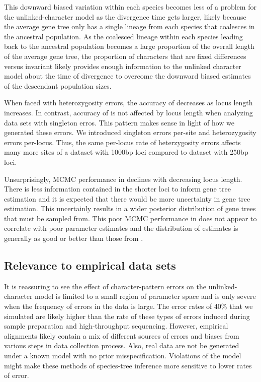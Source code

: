 This downward biased variation within each species becomes
less of a problem for the unlinked-character model as the
divergence time gets larger, likely because the average gene
tree only has a single lineage from each species that coalesces
in the ancestral population.
As the coalesced lineage within each species leading back
to the ancestral population becomes a large proportion
of the overall length of the average gene tree,
the proportion of characters that are fixed differences versus invariant
likely provides enough information to
the unlinked character model about the time of divergence to overcome
the downward biased estimates of the descendant population sizes.

When faced with heterozygosity errors,
the accuracy of \ecoevolity decreases as locus length increases.
In contrast, accuracy of \ecoevolity is not affected by locus
length when analyzing data sets with singleton erros.
This pattern makes sense in light of how we generated these errors.
We introduced singleton errors per-site and heterozygosity errors per-locus.
Thus, the same per-locus rate of heterzygosity errors affects many more sites
of a dataset with 1000bp loci compared to dataset with 250bp loci.

Unsurprisingly, MCMC performance in \beast declines with decreasing locus length.
There is less information contained in the shorter loci to inform gene tree estimation 
and it is expected that there would be more uncertainty in gene tree estimation.
This uncertainly results in a wider posterior distribution of gene trees that must be 
sampled from. This poor MCMC performance in \beast does not appear to correlate 
with poor parameter estimates and the distribution of estimates is generally as 
good or better than those from \ecoevolity. 


\subsection{Relevance to empirical data sets}
It is reassuring to see the effect of character-pattern errors on the
unlinked-character model is limited to a small region of parameter space and is
only severe when the frequency of errors in the data is large.
The error rates of 40\% that we simulated are likely higher than the rate of
these types of errors induced during sample preparation and high-throughput 
sequencing. However, empirical alignments likely contain a mix of different sources of
errors and biases from various steps in data collection process.
Also, real data are not be generated under a known model with no prior
misspecification.
Violations of the model might make these methods of species-tree inference more
sensitive to lower rates of error.

